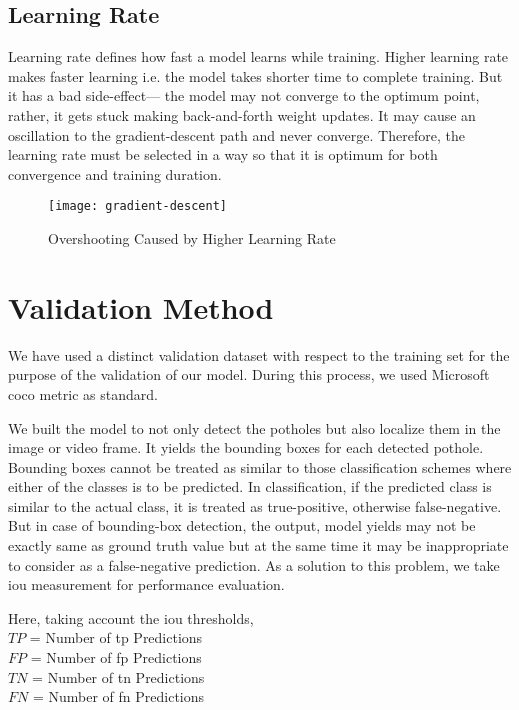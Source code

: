         \subsection{Learning Rate}
            Learning rate defines how fast a model learns while training\cite{yu1995dynamic}. Higher learning rate makes faster learning i.e. the model takes shorter time to complete training. But it has a bad side-effect--- the model may not converge to the optimum point, rather, it gets stuck making back-and-forth weight updates\cite{yu1995dynamic}. It may cause an oscillation to the gradient-descent path and never converge\cite{ruder2016overview}. Therefore, the learning rate must be selected in a way so that it is optimum for both convergence and training duration.
            \begin{figure}[h]
                \centering
                \texttt{[image: gradient-descent]}
                \caption{Overshooting Caused by Higher Learning Rate}
                \label{fig:gradient_descent}
            \end{figure}
            
    \section{Validation Method}
        We have used a distinct validation dataset with respect to the training set for the purpose of the validation of our model.
        During this process, we used Microsoft \acrshort{coco}\cite{lin2014microsoft} metric as standard.
        
        We built the model to not only detect the potholes but also localize them in the image or video frame. It yields the bounding boxes for each detected pothole. Bounding boxes cannot be treated as similar to those classification schemes where either of the classes is to be predicted. In classification, if the predicted class is similar to the actual class, it is treated as true-positive, otherwise false-negative\cite{kotsiantis2007supervised}. But in case of bounding-box detection, the output, model yields may not be exactly same as ground truth value but at the same time it may be inappropriate to consider as a false-negative prediction. As a solution to this problem, we take \acrfull{iou}\cite{rahman2016optimizing} measurement for performance evaluation.
            
        Here, taking account the \acrshort{iou} thresholds, \\
        $TP$ = Number of \acrlong{tp} Predictions \\
        $FP$ = Number of \acrlong{fp} Predictions \\
        $TN$ = Number of \acrlong{tn} Predictions \\
        $FN$ = Number of \acrlong{fn} Predictions
        
